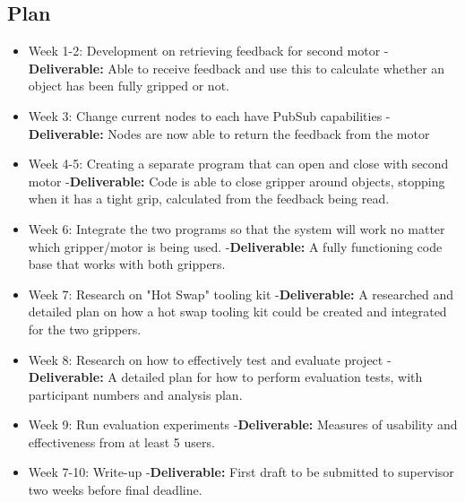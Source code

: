 \documentclass[11pt]{article}
\begin{document}
\subsection{Plan}\label{plan}
\begin{itemize}
	\item Week 1-2: Development on retrieving feedback for second motor
		- \textbf{Deliverable:} Able to receive feedback and use this to calculate whether an object has been fully gripped or not. 
	\item Week 3: Change current nodes to each have PubSub capabilities
		-\textbf{Deliverable:} Nodes are now able to return the feedback from the motor
	\item Week 4-5: Creating a separate program that can open and close with second motor
		-\textbf{Deliverable:} Code is able to close gripper around objects, stopping when it has a tight grip, calculated from the feedback being read. 
	\item Week 6: Integrate the two programs so that the system will work no matter which gripper/motor is being used. 
		-\textbf{Deliverable:} A fully functioning code base that works with both grippers. 
	\item Week 7: Research on "Hot Swap" tooling kit
		-\textbf{Deliverable:}  A researched and detailed plan on how a hot swap tooling kit could be created and integrated for the two grippers. 
	\item Week 8: Research on how to effectively test and evaluate project
		-\textbf{Deliverable:} A detailed plan for how to perform evaluation tests, with participant numbers and analysis plan. 
	\item Week 9: Run evaluation experiments 
		-\textbf{Deliverable:} Measures of usability and effectiveness from at least 5 users. 
	\item Week 7-10: Write-up
		-\textbf{Deliverable:} First draft to be submitted to supervisor two weeks before final deadline. 
\end{itemize}    

    
\end{document}

